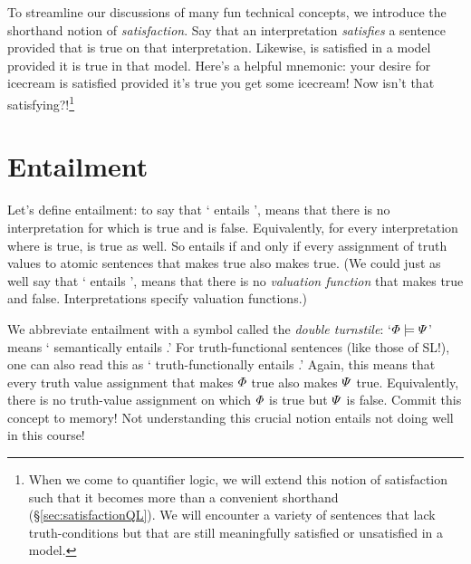 {{\color{black} To streamline our discussions of many fun technical concepts, we introduce the shorthand notion of \textit{satisfaction}. Say that an interpretation \textit{satisfies} a sentence \metaA{} provided that \metaA{} is true on that interpretation. Likewise, \metaA{} is satisfied in a model provided it is true in that model. Here's a helpful mnemonic: your desire for icecream is satisfied provided it's true you get some icecream! Now isn't that satisfying?!\footnote{{\color{black} When we come to quantifier logic, we will extend this notion of satisfaction such that it becomes more than a convenient shorthand (\S\ref{sec:satisfactionQL}). We will encounter a variety of sentences that lack truth-conditions but that are still meaningfully satisfied or unsatisfied in a model.}}


\section{Entailment}
\label{sec:entailmentSL}

Let's define entailment: to say that `\metaA{} entails \metaB{}', means that there is no interpretation for which \metaA{} is true and \metaB{} is false. {\color{black} Equivalently, for every interpretation where \metaA{} is true, \metaB{} is true as well.} So \metaA{} entails \metaB{} if and only if every assignment of truth values to atomic sentences that makes \metaA{} true also makes \metaB{} true. (We could just as well say that  `\metaA{} entails \metaB{}', means that there is no \emph{valuation function} that makes \metaA{} true and \metaB{} false. Interpretations specify valuation functions.)

We abbreviate entailment with a symbol called the \emph{double turnstile}:
`$\varPhi{}\models\varPsi{}$' means `\metaA{} semantically entails \metaB{}.' For truth-functional sentences (like those of SL!), one can also read this as `\metaA{} truth-functionally entails \metaB{}.' {\color{black}Again, this means that every truth value assignment that makes $\varPhi{}$ true also makes $\varPsi{}$ true. Equivalently, there is no truth-value assignment on which $\varPhi{}$ is true but $\varPsi{}$ is false. Commit this concept to memory! Not understanding this crucial notion entails not doing well in this course!} 

}}
